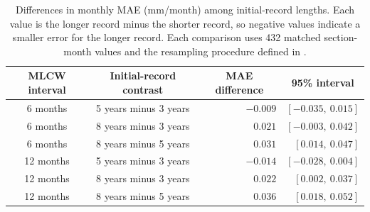 \begin{table}[H]
  \centering
  \small
  \renewcommand{\arraystretch}{1.15}
  \caption[Paired monthly-MAE differences among initial-record lengths.]{Differences in monthly MAE (mm/month) among initial-record lengths. Each value is the longer record minus the shorter record, so negative values indicate a smaller error for the longer record. Each comparison uses 432 matched section-month values and the resampling procedure defined in .}
  \label{tab:supp_initial_history_differences}
  \begin{tabular}{c|c|r|r}
    \toprule
    \multicolumn{1}{c|}{\textbf{MLCW interval}} & \multicolumn{1}{c|}{\textbf{Initial-record contrast}} & \multicolumn{1}{c|}{\textbf{MAE difference}} & \multicolumn{1}{c}{\textbf{95\% interval}} \\
    \midrule
    6 months & 5 years minus 3 years & $-0.009$ & $[-0.035,\ 0.015]$ \\
    6 months & 8 years minus 3 years & $0.021$ & $[-0.003,\ 0.042]$ \\
    6 months & 8 years minus 5 years & $0.031$ & $[0.014,\ 0.047]$ \\
    12 months & 5 years minus 3 years & $-0.014$ & $[-0.028,\ 0.004]$ \\
    12 months & 8 years minus 3 years & $0.022$ & $[0.002,\ 0.037]$ \\
    12 months & 8 years minus 5 years & $0.036$ & $[0.018,\ 0.052]$ \\
    \bottomrule
  \end{tabular}
\end{table}

